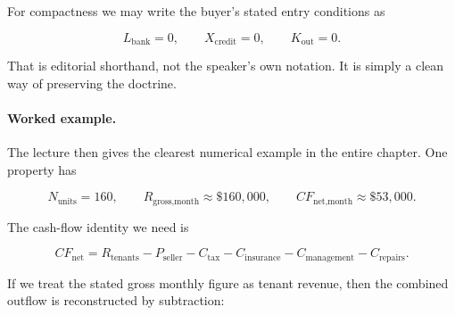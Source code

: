 For compactness we may write the buyer's stated entry conditions as

\begin{equation}
L_{\text{bank}}=0,
\qquad
X_{\text{credit}}=0,
\qquad
K_{\text{out}}=0.
\end{equation}

That is editorial shorthand, not the speaker's own notation. It is simply a clean way of preserving the doctrine.

\begin{figure}
\centering
{}
\end{figure}

\paragraph{Worked example.} The lecture then gives the clearest numerical example in the entire chapter. One property has

\begin{equation}
N_{\text{units}}=160,
\qquad
R_{\text{gross,month}}\approx \$160{,}000,
\qquad
CF_{\text{net,month}}\approx \$53{,}000.
\end{equation}

The cash-flow identity we need is

\begin{equation}
CF_{\text{net}}
=
R_{\text{tenants}}
-
P_{\text{seller}}
-
C_{\text{tax}}
-
C_{\text{insurance}}
-
C_{\text{management}}
-
C_{\text{repairs}}.
\end{equation}

If we treat the stated gross monthly figure as tenant revenue, then the combined outflow is reconstructed by subtraction:

